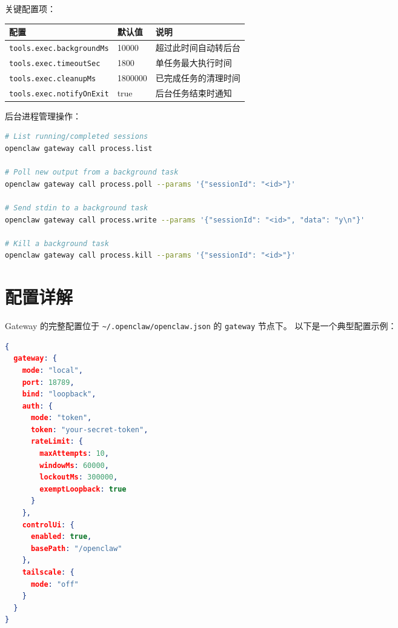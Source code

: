 \noindent 关键配置项：

\begin{center}
\begin{tabular}{lll}
\toprule
\textbf{配置} & \textbf{默认值} & \textbf{说明} \\
\midrule
\texttt{tools.exec.backgroundMs} & 10000 & 超过此时间自动转后台 \\
\texttt{tools.exec.timeoutSec} & 1800 & 单任务最大执行时间 \\
\texttt{tools.exec.cleanupMs} & 1800000 & 已完成任务的清理时间 \\
\texttt{tools.exec.notifyOnExit} & true & 后台任务结束时通知 \\
\bottomrule
\end{tabular}
\end{center}

\noindent 后台进程管理操作：

\begin{lstlisting}[language=bash]
# List running/completed sessions
openclaw gateway call process.list

# Poll new output from a background task
openclaw gateway call process.poll --params '{"sessionId": "<id>"}'

# Send stdin to a background task
openclaw gateway call process.write --params '{"sessionId": "<id>", "data": "y\n"}'

# Kill a background task
openclaw gateway call process.kill --params '{"sessionId": "<id>"}'
\end{lstlisting}

\section{配置详解}

Gateway 的完整配置位于 \texttt{\textasciitilde{}/.openclaw/openclaw.json} 的 \texttt{gateway} 节点下。
以下是一个典型配置示例：

\begin{lstlisting}[language=json]
{
  gateway: {
    mode: "local",
    port: 18789,
    bind: "loopback",
    auth: {
      mode: "token",
      token: "your-secret-token",
      rateLimit: {
        maxAttempts: 10,
        windowMs: 60000,
        lockoutMs: 300000,
        exemptLoopback: true
      }
    },
    controlUi: {
      enabled: true,
      basePath: "/openclaw"
    },
    tailscale: {
      mode: "off"
    }
  }
}
\end{lstlisting}

